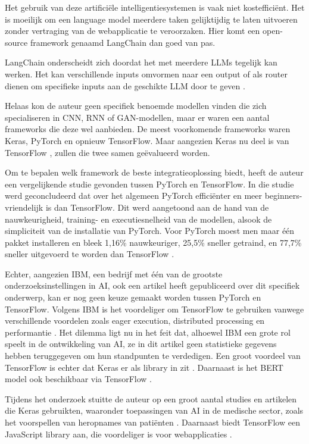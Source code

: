 \documentclass[dutch]{hogent-article}
\begin{document}
Het gebruik van deze artificiële intelligentiesystemen is vaak niet kostefficiënt. Het is moeilijk om een language model meerdere taken gelijktijdig te laten uitvoeren zonder vertraging van de webapplicatie te veroorzaken. Hier komt een open-source framework genaamd LangChain dan goed van pas.

LangChain onderscheidt zich doordat het met meerdere LLMs tegelijk kan werken. Het kan verschillende inputs omvormen naar een output of als router dienen om specifieke inputs aan de geschikte LLM door te geven \autocite{Topsakal2023CreatingLL}.

Helaas kon de auteur geen specifiek benoemde modellen vinden die zich specialiseren in CNN, RNN of GAN-modellen, maar er waren een aantal frameworks die deze wel aanbieden. De meest voorkomende frameworks waren Keras, PyTorch en opnieuw TensorFlow. Maar aangezien Keras nu deel is van TensorFlow \autocite{TensorFlow2023}, zullen die twee samen geëvalueerd worden.

Om te bepalen welk framework de beste integratieoplossing biedt, heeft de auteur een vergelijkende studie gevonden tussen PyTorch en TensorFlow. In die studie werd geconcludeerd dat over het algemeen PyTorch efficiënter en meer beginners-vriendelijk is dan TensorFlow. Dit werd aangetoond aan de hand van de nauwkeurigheid, training- en executiesnelheid van de modellen, alsook de simpliciteit van de installatie van PyTorch. Voor PyTorch moest men maar één pakket installeren en bleek 1,16\% nauwkeuriger, 25,5\% sneller getraind, en 77,7\% sneller uitgevoerd te worden dan TensorFlow \autocite{Novac2022AnalysisOT}.

Echter, aangezien IBM, een bedrijf met één van de grootste onderzoeksinstellingen in AI, ook een artikel heeft gepubliceerd over dit specifiek onderwerp, kan er nog geen keuze gemaakt worden tussen PyTorch en TensorFlow. Volgens IBM is het voordeliger om TensorFlow te gebruiken vanwege verschillende voordelen zoals eager execution, distributed processing en performantie \autocite{Madhavan2021}. Het dilemma ligt nu in het feit dat, alhoewel IBM een grote rol speelt in de ontwikkeling van AI, ze in dit artikel geen statistieke gegevens hebben teruggegeven om hun standpunten te verdedigen. Een groot voordeel van TensorFlow is echter dat Keras er als library in zit \autocite{Novac2022AnalysisOT}. Daarnaast is het BERT model ook beschikbaar via TensorFlow \autocite{TensorFlow2023BERT}.

Tijdens het onderzoek stuitte de auteur op een groot aantal studies en artikelen die Keras gebruikten, waaronder toepassingen van AI in de medische sector, zoals het voorspellen van heropnames van patiënten \autocite{Anshik2021}. Daarnaast biedt TensorFlow een JavaScript library aan, die voordeliger is voor webapplicaties \autocite{TensorFlowJS2015}.
\end{document}
